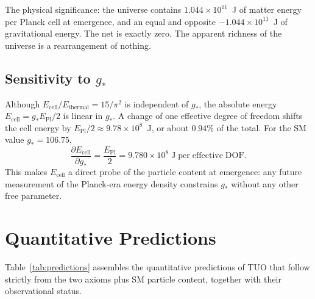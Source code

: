 \documentclass[12pt,a4paper]{article}
\theoremstyle{definition}
\theoremstyle{remark}
\newcommand{\EPl}{E_{\mathrm{Pl}}}
\newcommand{\gstar}{g_{*}}
\begin{document}
The physical significance: the universe contains $1.044 \times 10^{11}$~J
of matter energy per Planck cell at emergence, and an equal and opposite
$-1.044 \times 10^{11}$~J of gravitational energy.
The net is exactly zero. The apparent richness of the universe is a
rearrangement of nothing.

\subsection{Sensitivity to $\gstar$}

Although $E_\mathrm{cell}/E_\mathrm{thermal} = 15/\pi^2$ is independent
of $\gstar$, the absolute energy $E_\mathrm{cell} = \gstar\EPl/2$ is
linear in $\gstar$.
A change of one effective degree of freedom shifts the cell energy by
$\EPl/2 \approx 9.78 \times 10^{8}$~J, or about $0.94\%$ of the total.
For the SM value $\gstar = 106.75$,
\begin{equation}
  \frac{\partial E_\mathrm{cell}}{\partial \gstar} = \frac{\EPl}{2}
  = 9.780 \times 10^8\;\mathrm{J\;per\;effective\;DOF.}
\end{equation}
This makes $E_\mathrm{cell}$ a direct probe of the particle content at
emergence: any future measurement of the Planck-era energy density
constrains $\gstar$ without any other free parameter.

\section{Quantitative Predictions}
\label{sec:predictions}

Table~\ref{tab:predictions} assembles the quantitative predictions of TUO
that follow strictly from the two axioms plus SM particle content,
together with their observational status.
\end{document}
